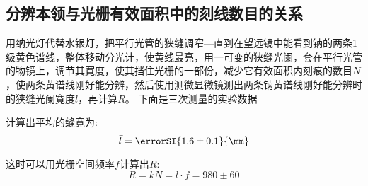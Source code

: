 \documentclass[a4paper]{article}
\begin{document}
\subsection{分辨本领与光栅有效面积中的刻线数目的关系}
\begin{spacing}{1.6}
	用纳光灯代替水银灯，把平行光管的狭缝调窄—直到在望远镜中能看到钠的两条1级黄色谱线，整体移动分光计，使黄线最亮，用一可变的狭缝光阑，套在平行光管的物镜上，调节其寛度，使其挡住光栅的一部份，减少它有效面积内刻痕的数目$N$，使两条黄谱线刚好能分辨，然后使用测微显微镜测出两条钠黄谱线刚好能分辨时的狭缝光阑寛度$l$，再计算$R$。
	下面是三次测量的实验数据

	\begin{table}[htbp]
		\centering
		\captionsetup{justification=centering,margin=2cm}
		\caption{\label{tab:tab_data5}刚好分辨时窄缝寛度实验数据表}
	\end{table}\par

	计算出平均的缝寛为:
	$$\bar l = \errorSI{1.6\pm0.1}{\mm}$$

	这时可以用光栅空间频率$f$计算出$R$:
	$$R=kN=l\cdot f= 980\pm 60$$
\end{spacing}
\end{document}

